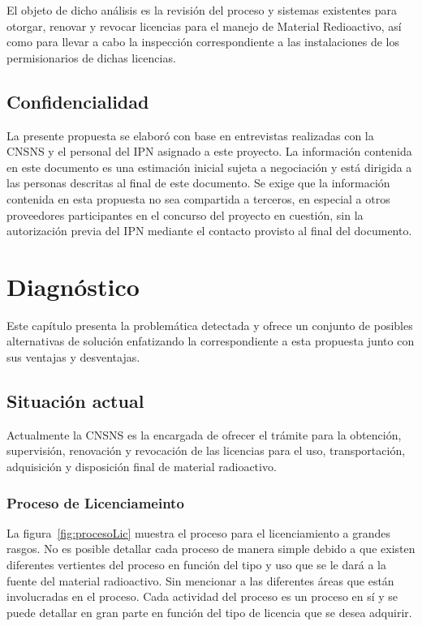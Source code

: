 \documentclass[10pt]{book}
\begin{document}
	El objeto de dicho análisis es la revisión del proceso y sistemas existentes para  otorgar, renovar y revocar licencias para el manejo de Material Redioactivo, así como para llevar a cabo la inspección correspondiente a las instalaciones de los permisionarios de dichas licencias. 
	

\section{Confidencialidad}

	La presente propuesta se elaboró con base en entrevistas realizadas con la CNSNS y el personal del IPN asignado a este proyecto. La información contenida en este documento es una estimación inicial sujeta a negociación y está dirigida a las personas descritas al final de este documento. Se exige que la información contenida en esta propuesta no sea compartida a terceros, en especial a otros proveedores participantes en el concurso del proyecto en cuestión, sin la autorización previa del IPN mediante el contacto provisto al final del documento.


\chapter{Diagnóstico} 

	Este capítulo presenta la problemática detectada y ofrece un conjunto de posibles alternativas de solución enfatizando la correspondiente a esta propuesta junto con sus ventajas y desventajas.
	
\section{Situación actual}

	Actualmente la CNSNS es la encargada de ofrecer el trámite para la obtención, supervisión, renovación y revocación de las licencias para el uso, transportación, adquisición y disposición final de material radioactivo.
	
\subsection{Proceso de Licenciameinto}

	La figura~\ref{fig:procesoLic} muestra el proceso para el licenciamiento a grandes rasgos. No es posible detallar cada proceso de manera simple debido a que existen diferentes vertientes del proceso en función del tipo y uso que se le dará a la fuente del material radioactivo. Sin mencionar a las diferentes áreas que están involucradas en el proceso. Cada actividad del proceso es un proceso en sí y se puede detallar en gran parte en función del tipo de licencia que se desea adquirir.
\end{document}
